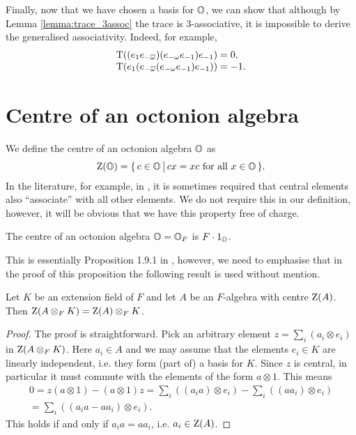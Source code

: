 Finally, now that we have chosen a basis for $\mathbb{O}$, we can show that although by 
Lemma \ref{lemma:trace_3assoc} the trace is $3$-associative, it is impossible to
derive the generalised associativity. Indeed, for example,
\begin{equation*}
	\begin{array}{r@{\;}c@{\;}l}
		\Tr((e_{1}e_{-\bar{\omega}})(e_{-\omega}e_{-1}) e_{-1}) & = & 0,\\
		\Tr(e_1(e_{-\bar{\omega}}(e_{-\omega} e_{-1})e_{-1})) & = & -1.
	\end{array}
\end{equation*}

\section{Centre of an octonion algebra}

We define the centre of an octonion algebra $\mathbb{O}$ as
\begin{equation}
	\label{eq:octonion_centre}
	\mathord{\mathrm{Z}}(\mathbb{O}) = \{\,c \in \mathbb{O}\,\big|\, cx = xc\ \mbox{for all}\ x \in \mathbb{O}\,\}.
\end{equation}
In the literature, for example, in \cite{Schafer}, it is sometimes required that central 
elements also ``associate'' with all other elements. We do not require this in our definition,
however, it will be obvious that we have this property free of charge. 

\begin{proposition}
	\label{prop:octonion_centre}
	The centre of an octonion algebra $\mathbb{O}=\mathbb{O}_F$ is $F\cdot 1_{\mathbb{O}}$.  
\end{proposition}

This is essentially Proposition 1.9.1 in \cite{SpringerVeldkamp}, however, we need to emphasise
that in the proof of this proposition the following result is used without mention.

\begin{lemma}
	Let $K$ be an extension field of $F$ and let $A$ be an $F$-algebra with centre $\mathord{\mathrm{Z}}(A)$.
	Then $\mathord{\mathrm{Z}}(A\otimes_F K) = \mathord{\mathrm{Z}}(A)\otimes_F K$. 
\end{lemma}

\begin{proof}
	The proof is straightforward. Pick an arbitrary element $z = \sum_i (a_i \otimes e_i)$ in
	\mbox{$\mathord{\mathrm{Z}}(A\otimes_F K)$}. Here $a_i \in A$ and we may assume that the elements $e_i \in K$ are linearly 
	independent, i.e. they form (part of) a basis for $K$. Since $z$ is central, in particular it 
	must commute with the elements of the form $a \otimes 1$. This means
	\begin{align*}
		0 = z (a \otimes 1) - (a\otimes 1) z = \sum_i ( (a_i a) \otimes e_i )
			- \sum_i( (a a_i) \otimes e_i ) \\
		= \sum_i ( (a_i a - a a_i) \otimes e_i ). 
	\end{align*}
	This holds if and only if $a_i a = a a_i$, i.e. $a_i \in \mathord{\mathrm{Z}}(A)$. 
\end{proof}

